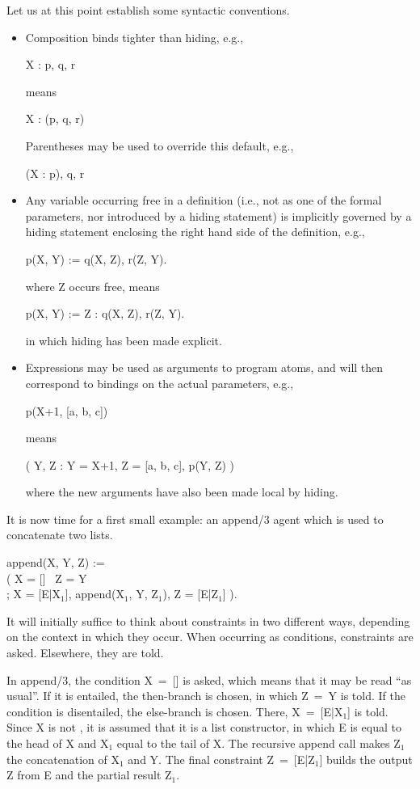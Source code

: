 Let us at this point establish some syntactic conventions.
%
\begin{itemize}
\item
Composition binds tighter than hiding, e.g.,
%
\begin{progex}
X : p, q, r
\end{progex}%
%
means
%
\begin{progex}
X : (p, q, r)
\end{progex}%
%
Parentheses may be used to override this default, e.g.,
%
\begin{progex}
(X : p), q, r
\end{progex}%
%
\item
Any variable occurring free in a definition (i.e., not as one of the
formal parameters, nor introduced by a hiding statement) is implicitly
governed by a hiding statement enclosing the right hand side of the
definition, e.g.,
%
\begin{progex}
p(X, Y) := q(X, Z), r(Z, Y).
\end{progex}%
%
where Z occurs free, means
%
\begin{progex}
p(X, Y) := Z : q(X, Z), r(Z, Y).
\end{progex}%
%
in which hiding has been made explicit.

\item
Expressions may be used as arguments to program atoms, and will then
correspond to bindings on the actual parameters, e.g.,
%
\begin{progex}
p(X+1, [a, b, c])
\end{progex}%
%
means
%
\begin{progex}
( Y, Z : Y = X+1, Z = [a, b, c], p(Y, Z) )
\end{progex}%
%
where the new arguments have also been made local by hiding.
\end{itemize}
%
It is now time for a first small example: an append/3 agent which is
used to concatenate two lists.
%
\begin{program}
append(X, Y, Z) := \\
\>\>( X = [] \cond\ Z = Y \\
\>\>; X = [E|X$_1$], append(X$_1$, Y, Z$_1$),  Z = [E|Z$_1$] ).
\end{program}%
%
It will initially suffice to think about constraints in two different
ways, depending on the context in which they occur.  When occurring as
conditions, constraints are asked.  Elsewhere, they are told.

In append/3, the condition {\prog X~=~[]} is asked, which means that
it may be read ``as usual''.  If it is entailed, the then-branch is
chosen, in which {\prog Z~=~Y} is told.  If the condition is
disentailed, the else-branch is chosen.  There, {\prog X~=~[E|X$_1$]}
is told.  Since {\prog X} is not {\prog []}, it is assumed that it is
a list constructor, in which E is equal to the head of {\prog X} and
{\prog X$_1$} equal to the tail of {\prog X.}  The recursive append
call makes {\prog Z$_1$} the concatenation of {\prog X$_1$} and {\prog
Y.}  The final constraint {\prog Z~=~[E|Z$_1$]} builds the output
{\prog Z} from {\prog E} and the partial result {\prog Z$_1$}.

